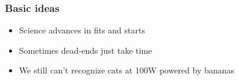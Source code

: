 \begin{frame}
  \frametitle{Basic ideas}
  \begin{itemize}
  \item Science advances in fits and starts
  \item Sometimes dead-ends just take time
  \item We still can't recognize cats at 100W powered by bananas
  \end{itemize}
\end{frame}



\begin{frame}
  \vspace{-10.2cm}
\end{frame}


